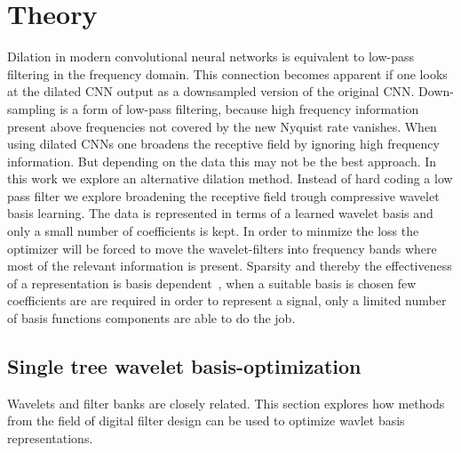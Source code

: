 \documentclass{article}
\begin{document}
\section{Theory}
Dilation in modern convolutional neural networks is equivalent to low-pass filtering in the frequency domain. This connection becomes apparent if one looks at the dilated CNN output as a downsampled version of the original CNN. Down-sampling is a form of low-pass filtering, because high frequency information present above frequencies not covered by the new Nyquist rate vanishes.
When using dilated CNNs one broadens the receptive field by ignoring high frequency information. But depending on the data this may not be the best approach. In this work we explore an alternative dilation method. Instead of hard coding a low pass filter we explore broadening the receptive field trough compressive wavelet basis learning. 
The data is represented in terms of a learned wavelet basis and only a small number of coefficients is kept. In order to minmize the loss the optimizer will be forced to move the wavelet-filters into frequency bands where most of the relevant information is present. 
Sparsity and thereby the effectiveness of a representation is basis dependent~\cite{Strang1997}\cite{Strang1994}, when a suitable basis is chosen few coefficients are are required in order to represent a signal, only a limited number of basis functions components are able to do the job.



\subsection{Single tree wavelet basis-optimization}
Wavelets and filter banks are closely related. This section explores how methods from the field of digital filter design can be used to optimize wavlet basis representations.
\end{document}
